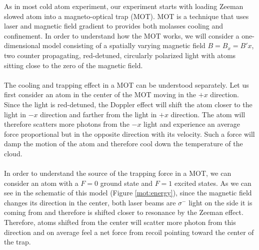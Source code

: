 As in most cold atom experiment, our experiment starts with loading Zeeman slowed atom into a magneto-optical trap (MOT). MOT is a technique that uses laser and magnetic field gradient to provides both molasses cooling and confinement. In order to understand how the MOT works, we will consider a one-dimensional model consisting of a spatially varying magnetic field $B=B_x=B'x$, two counter propagating, red-detuned, circularly polarized light with atoms sitting close to the zero of the magnetic field.\\
\\
The cooling and trapping effect in a MOT can be understood separately. Let us first consider an atom in the center of the MOT moving in the $+x$ direction. Since the light is red-detuned, the Doppler effect will shift the atom closer to the light in $-x$ direction and farther from the light in $+x$ direction. The atom will therefore scatters more photons from the $-x$ light and experience an average force proportional but in the opposite direction with its velocity. Such a force will damp the motion of the atom and therefore cool down the temperature of the cloud.\\
\\
In order to understand the source of the trapping force in a MOT, we can consider an atom with a $F=0$ ground state and $F=1$ excited states. As we can see in the schematic of this model (Figure \ref{mot:energy}), since the magnetic field changes its direction in the center, both laser beams are $\sigma^-$ light on the side it is coming from and therefore is shifted closer to resonance by the Zeeman effect. Therefore, atoms shifted from the center will scatter more photon from this direction and on average feel a net force from recoil pointing toward the center of the trap.\\
